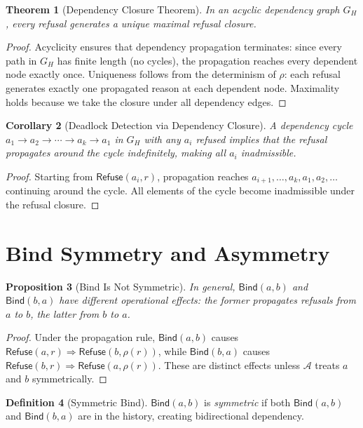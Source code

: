 \documentclass[12pt, a4paper, openany]{book}
\theoremstyle{plain}
\newtheorem{theorem}{Theorem}[chapter]
\newtheorem{proposition}[theorem]{Proposition}
\newtheorem{corollary}[theorem]{Corollary}
\theoremstyle{definition}
\newtheorem{definition}[theorem]{Definition}
\theoremstyle{remark}
\newcommand{\Refuse}{\mathsf{Refuse}}
\newcommand{\Bind}{\mathsf{Bind}}
\newcommand{\calA}{\mathcal{A}}
\begin{document}
\begin{theorem}[Dependency Closure Theorem]
In an acyclic dependency graph $G_H$, every refusal generates a unique
maximal refusal closure.
\end{theorem}

\begin{proof}
Acyclicity ensures that dependency propagation terminates: since every path in
$G_H$ has finite length (no cycles), the propagation reaches every dependent
node exactly once. Uniqueness follows from the determinism of $\rho$: each
refusal generates exactly one propagated reason at each dependent node.
Maximality holds because we take the closure under all dependency edges.
\end{proof}

\begin{corollary}[Deadlock Detection via Dependency Closure]
A dependency cycle $a_1 \to a_2 \to \cdots \to a_k \to a_1$ in $G_H$
with any $a_i$ refused implies that the refusal propagates around the cycle
indefinitely, making all $a_i$ inadmissible.
\end{corollary}

\begin{proof}
Starting from $\Refuse(a_i, r)$, propagation reaches $a_{i+1}, \ldots, a_k,
a_1, a_2, \ldots$ continuing around the cycle. All elements of the cycle
become inadmissible under the refusal closure.
\end{proof}

\section{Bind Symmetry and Asymmetry}

\begin{proposition}[Bind Is Not Symmetric]
In general, $\Bind(a, b)$ and $\Bind(b, a)$ have different operational effects:
the former propagates refusals from $a$ to $b$, the latter from $b$ to $a$.
\end{proposition}

\begin{proof}
Under the propagation rule, $\Bind(a, b)$ causes $\Refuse(a, r) \Rightarrow
\Refuse(b, \rho(r))$, while $\Bind(b, a)$ causes $\Refuse(b, r) \Rightarrow
\Refuse(a, \rho(r))$. These are distinct effects unless $\calA$ treats $a$ and
$b$ symmetrically.
\end{proof}

\begin{definition}[Symmetric Bind]
$\Bind(a, b)$ is \emph{symmetric} if both $\Bind(a, b)$ and $\Bind(b, a)$ are
in the history, creating bidirectional dependency.
\end{definition}
\end{document}
